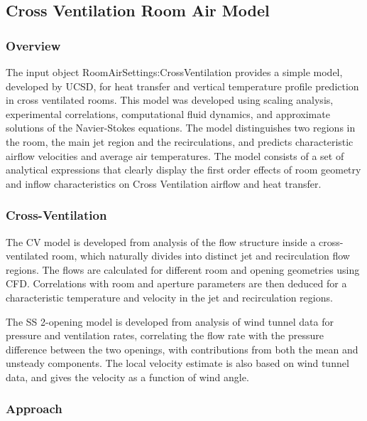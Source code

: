 {\subsection{Cross Ventilation Room Air Model}\label{cross-ventilation-room-air-model}

\subsubsection{Overview}\label{overview-3-001}

The input object RoomAirSettings:CrossVentilation provides a simple model, developed by UCSD, for heat transfer and vertical temperature profile prediction in cross ventilated rooms. This model was developed using scaling analysis, experimental correlations, computational fluid dynamics, and approximate solutions of the Navier-Stokes equations. The model distinguishes two regions in the room, the main jet region and the recirculations, and predicts characteristic airflow velocities and average air temperatures. The model consists of a set of analytical expressions that clearly display the first order effects of room geometry and inflow characteristics on Cross Ventilation airflow and heat transfer.

\subsubsection{Cross-Ventilation}\label{cross-ventilation}

The CV model is developed from analysis of the flow structure inside a cross-ventilated room, which naturally divides into distinct jet and recirculation flow regions. The flows are calculated for different room and opening geometries using CFD. Correlations with room and aperture parameters are then deduced for a characteristic temperature and velocity in the jet and recirculation regions.

The SS 2-opening model is developed from analysis of wind tunnel data for pressure and ventilation rates, correlating the flow rate with the pressure difference between the two openings, with contributions from both the mean and unsteady components. The local velocity estimate is also based on wind tunnel data, and gives the velocity as a function of wind angle.

\subsubsection{Approach}\label{approach}

}
